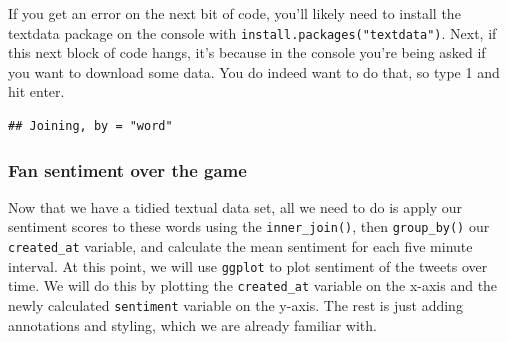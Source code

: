 \documentclass[
]{book}
\newenvironment{Shaded}{\begin{snugshade}}{\end{snugshade}}
\newcommand{\DataTypeTok}[1]{\textcolor[rgb]{0.13,0.29,0.53}{#1}}
\newcommand{\KeywordTok}[1]{\textcolor[rgb]{0.13,0.29,0.53}{\textbf{#1}}}
\newcommand{\NormalTok}[1]{#1}
\newcommand{\OperatorTok}[1]{\textcolor[rgb]{0.81,0.36,0.00}{\textbf{#1}}}
\newcommand{\StringTok}[1]{\textcolor[rgb]{0.31,0.60,0.02}{#1}}
\begin{document}
If you get an error on the next bit of code, you'll likely need to install the textdata package on the console with \texttt{install.packages("textdata")}. Next, if this next block of code hangs, it's because in the console you're being asked if you want to download some data. You do indeed want to do that, so type 1 and hit enter.

\begin{Shaded}
\end{Shaded}

\begin{verbatim}
## Joining, by = "word"
\end{verbatim}

\hypertarget{fan-sentiment-over-the-game}{%
\subsubsection{Fan sentiment over the game}\label{fan-sentiment-over-the-game}}

Now that we have a tidied textual data set, all we need to do is apply our sentiment scores to these words using the \texttt{inner\_join()}, then \texttt{group\_by()} our \texttt{created\_at} variable, and calculate the mean sentiment for each five minute interval. At this point, we will use \texttt{ggplot} to plot sentiment of the tweets over time. We will do this by plotting the \texttt{created\_at} variable on the x-axis and the newly calculated \texttt{sentiment} variable on the y-axis. The rest is just adding annotations and styling, which we are already familiar with.

\begin{Shaded}
\end{Shaded}
\end{document}
